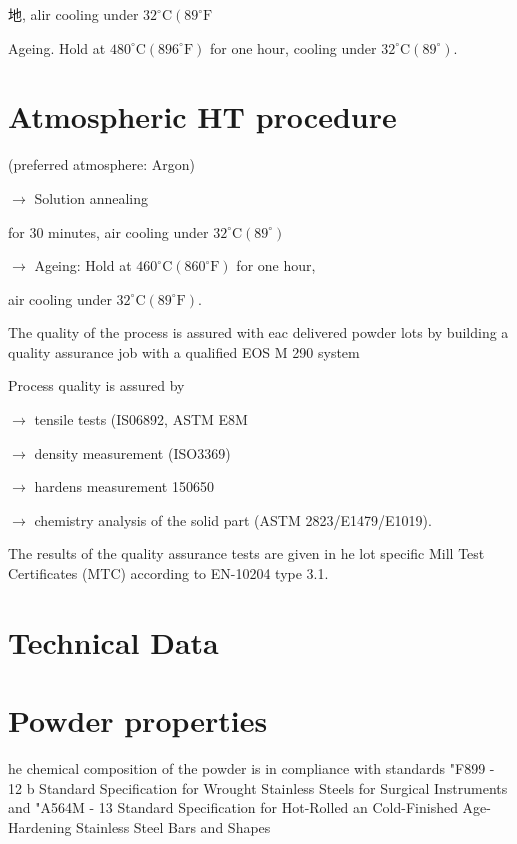 \documentclass[10pt]{article}
\begin{document}
地, alir cooling under $32^{\circ} \mathrm{C}\left(89^{\circ} \mathrm{F}\right.$

Ageing. Hold at $480^{\circ} \mathrm{C}\left(896^{\circ} \mathrm{F}\right)$ for one hour, cooling under $32^{\circ} \mathrm{C}\left(89^{\circ}\right)$.

\section*{Atmospheric HT procedure}
(preferred atmosphere: Argon)

$\rightarrow$ Solution annealing

for 30 minutes, air cooling under $32^{\circ} \mathrm{C}\left(89^{\circ}\right)$

$\rightarrow$ Ageing: Hold at $460^{\circ} \mathrm{C}\left(860^{\circ} \mathrm{F}\right)$ for one hour,

air cooling under $32^{\circ} \mathrm{C}\left(89^{\circ} \mathrm{F}\right)$.

The quality of the process is assured with eac delivered powder lots by building a quality assurance job with a qualified EOS M 290 system

Process quality is assured by

$\rightarrow$ tensile tests (IS06892, ASTM E8M

$\rightarrow$ density measurement (ISO3369)

$\rightarrow$ hardens measurement 150650

$\longrightarrow$ chemistry analysis of the solid part (ASTM 2823/E1479/E1019).

The results of the quality assurance tests are given in he lot specific Mill Test Certificates (MTC) according to EN-10204 type 3.1.

\section*{Technical Data}
\section*{Powder properties}
he chemical composition of the powder is in compliance with standards "F899 - 12 b Standard Specification for Wrought Stainless Steels for Surgical Instruments and "A564M - 13 Standard Specification for Hot-Rolled an Cold-Finished Age-Hardening Stainless Steel Bars and Shapes
\end{document}
